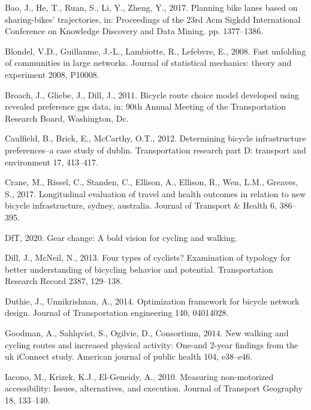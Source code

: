 \documentclass[]{elsarticle} %
\begin{document}
\leavevmode\hypertarget{ref-bao2017planning}{}%
Bao, J., He, T., Ruan, S., Li, Y., Zheng, Y., 2017. Planning bike lanes
based on sharing-bikes' trajectories, in: Proceedings of the 23rd Acm
Sigkdd International Conference on Knowledge Discovery and Data Mining.
pp. 1377--1386.

\leavevmode\hypertarget{ref-blondel2008fast}{}%
Blondel, V.D., Guillaume, J.-L., Lambiotte, R., Lefebvre, E., 2008. Fast
unfolding of communities in large networks. Journal of statistical
mechanics: theory and experiment 2008, P10008.

\leavevmode\hypertarget{ref-broach2011bicycle}{}%
Broach, J., Gliebe, J., Dill, J., 2011. Bicycle route choice model
developed using revealed preference gps data, in: 90th Annual Meeting of
the Transportation Research Board, Washington, Dc.

\leavevmode\hypertarget{ref-caulfield2012determining}{}%
Caulfield, B., Brick, E., McCarthy, O.T., 2012. Determining bicycle
infrastructure preferences--a case study of dublin. Transportation
research part D: transport and environment 17, 413--417.

\leavevmode\hypertarget{ref-crane2017longitudinal}{}%
Crane, M., Rissel, C., Standen, C., Ellison, A., Ellison, R., Wen, L.M.,
Greaves, S., 2017. Longitudinal evaluation of travel and health outcomes
in relation to new bicycle infrastructure, sydney, australia. Journal of
Transport \& Health 6, 386--395.

\leavevmode\hypertarget{ref-departmentgearchange2020}{}%
DfT, 2020. Gear change: A bold vision for cycling and walking.

\leavevmode\hypertarget{ref-dill2013four}{}%
Dill, J., McNeil, N., 2013. Four types of cyclists? Examination of
typology for better understanding of bicycling behavior and potential.
Transportation Research Record 2387, 129--138.

\leavevmode\hypertarget{ref-duthie2014optimization}{}%
Duthie, J., Unnikrishnan, A., 2014. Optimization framework for bicycle
network design. Journal of Transportation engineering 140, 04014028.

\leavevmode\hypertarget{ref-goodman2014new}{}%
Goodman, A., Sahlqvist, S., Ogilvie, D., Consortium, 2014. New walking
and cycling routes and increased physical activity: One-and 2-year
findings from the uk iConnect study. American journal of public health
104, e38--e46.

\leavevmode\hypertarget{ref-iacono2010measuring}{}%
Iacono, M., Krizek, K.J., El-Geneidy, A., 2010. Measuring non-motorized
accessibility: Issues, alternatives, and execution. Journal of Transport
Geography 18, 133--140.
\end{document}
